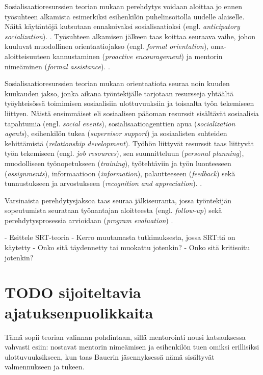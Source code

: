 \documentclass[utf8]{gradu3}
\begin{document}
Sosialisaatioresurssien teorian mukaan perehdytys voidaan aloittaa jo ennen työsuhteen alkamista esimerkiksi esihenkilön puhelinsoitolla uudelle alaiselle. Näitä käytäntöjä kutsutaan ennakoivaksi sosialisaatioksi (engl. \textit{anticipatory socialization}). \parencite{saks-gruman-2012}. Työsuhteen alkamisen jälkeen taas koittaa seuraava vaihe, johon kuuluvat muodollinen orientaatiojakso (engl. \textit{formal orientation}), oma-aloitteisuuteen kannustaminen (\textit{proactive encouragement}) ja mentorin nimeäminen (\textit{formal assistance}). \parencite{saks-gruman-2012}.

Sosialisaatioresurssien teorian mukaan orientaatiota seuraa noin kuuden kuukauden jakso, jonka aikana työntekijälle tarjotaan resursseja yhtäältä työyhteisössä toimimisen sosiaalisiin ulottuvuuksiin ja toisaalta työn tekemiseen liittyen. Näistä ensimmäiset eli sosiaalisen pääoman resurssit sisältävät sosiaalisia tapahtumia (engl. \textit{social events}), sosialisaatioagenttien apua (\textit{socialization agents}), esihenkilön tukea (\textit{supervisor support}) ja sosiaalisten suhteiden kehittämistä (\textit{relationship development}). Työhön liittyvät resurssit taas liittyvät työn tekemiseen (engl. \textit{job resources}), sen suunnitteluun (\textit{personal planning}), muodolliseen työnopetukseen (\textit{training}), työtehtäviin ja työn luonteeseen (\textit{assignments}), informaatioon (\textit{information}), palautteeseen (\textit{feedback}) sekä tunnustukseen ja arvostukseen (\textit{recognition and appreciation}). \parencite{saks-gruman-2012}.

Varsinaista perehdytysjaksoa taas seuraa jälkiseuranta, jossa työntekijän sopeutumista seurataan työnantajan aloitteesta (engl. \textit{follow-up}) sekä perehdytysprosessia arvioidaan (\textit{program evaluation}) \parencite{saks-gruman-2012}.

\textcite{cai-ym-2021}


- Esittele SRT-teoria
- Kerro muutamasta tutkimuksesta, jossa SRT:tä on käytetty
- Onko sitä täydennetty tai muokattu jotenkin?
- Onko sitä kritisoitu jotenkin?

\section{TODO sijoiteltavia ajatuksenpuolikkaita}

Tämä sopii teorian valinnan pohdintaan, sillä mentorointi nousi katsauksessa vahvasti esiin:
\textcite{saks-gruman-2012} nostavat mentorin nimeämisen ja esihenkilön tuen omiksi erillisiksi ulottuvuuksikseen, kun taas Bauerin jäsennyksessä nämä sisältyvät valmennukseen ja tukeen.
\end{document}
